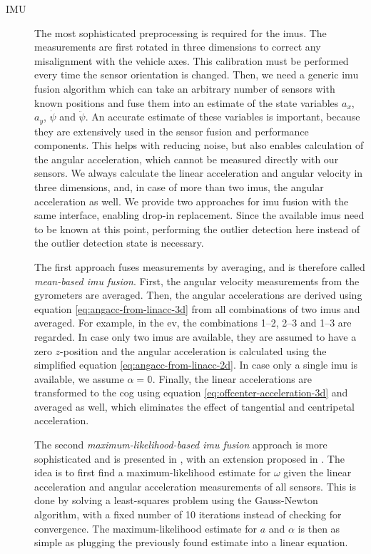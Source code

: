 \begin{description}
\item[IMU] The most sophisticated preprocessing is required for the \glspl{imu}. The measurements are first rotated in three dimensions to correct any misalignment with the vehicle axes. This calibration must be performed every time the sensor orientation is changed. Then, we need a generic \gls{imu} fusion algorithm which can take an arbitrary number of sensors with known positions and fuse them into an estimate of the state variables $a_x$, $a_y$, $\dot{\psi}$ and $\ddot{\psi}$. An accurate estimate of these variables is important, because they are extensively used in the sensor fusion and performance components. This helps with reducing noise, but also enables calculation of the angular acceleration, which cannot be measured directly with our sensors. We always calculate the linear acceleration and angular velocity in three dimensions, and, in case of more than two \glspl{imu}, the angular acceleration as well. We provide two approaches for \gls{imu} fusion with the same interface, enabling drop-in replacement. Since the available \glspl{imu} need to be known at this point, performing the outlier detection here instead of the outlier detection state is necessary.

The first approach fuses measurements by averaging, and is therefore called \textit{mean-based \gls{imu} fusion}. First, the angular velocity measurements from the gyrometers are averaged. Then, the angular accelerations are derived using equation \ref{eq:angacc-from-linacc-3d} from all combinations of two \glspl{imu} and averaged. For example, in the \gls{ev}, the combinations 1--2, 2--3 and 1--3 are regarded. In case only two \glspl{imu} are available, they are assumed to have a zero $z$-position and the angular acceleration is calculated using the simplified equation \ref{eq:angacc-from-linacc-2d}. In case only a single \gls{imu} is available, we assume $\alpha = \mathbb{0}$. Finally, the linear accelerations are transformed to the \gls{cog} using equation \ref{eq:offcenter-acceleration-3d} and averaged as well, which eliminates the effect of tangential and centripetal acceleration.

The second \textit{maximum-likelihood-based \gls{imu} fusion} approach is more sophisticated and is presented in \cite{Skog.2016}, with an extension proposed in \cite{Wahlstrom.2018}. The idea is to first find a maximum-likelihood estimate for $\omega$ given the linear acceleration and angular acceleration measurements of all sensors. This is done by solving a least-squares problem using the Gauss-Newton algorithm, with a fixed number of 10 iterations instead of checking for convergence. The maximum-likelihood estimate for $a$ and $\alpha$ is then as simple as plugging the previously found estimate into a linear equation.


\end{description}
